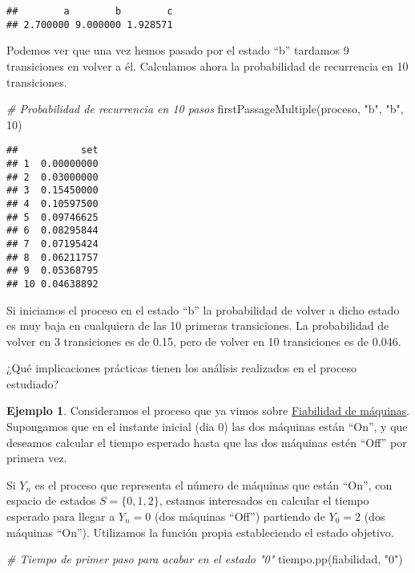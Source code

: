 \documentclass[
]{book}
\newenvironment{Shaded}{\begin{snugshade}}{\end{snugshade}}
\newcommand{\CommentTok}[1]{\textcolor[rgb]{0.56,0.35,0.01}{\textit{#1}}}
\newcommand{\DecValTok}[1]{\textcolor[rgb]{0.00,0.00,0.81}{#1}}
\newcommand{\FunctionTok}[1]{\textcolor[rgb]{0.00,0.00,0.00}{#1}}
\newcommand{\NormalTok}[1]{#1}
\newcommand{\StringTok}[1]{\textcolor[rgb]{0.31,0.60,0.02}{#1}}
\theoremstyle{definition}
\theoremstyle{definition}
\newtheorem{example}{Ejemplo}[chapter]
\theoremstyle{definition}
\theoremstyle{definition}
\theoremstyle{remark}
\begin{document}
\begin{verbatim}
##        a        b        c 
## 2.700000 9.000000 1.928571
\end{verbatim}

Podemos ver que una vez hemos pasado por el estado ``b'' tardamos 9 transiciones en volver a él. Calculamos ahora la probabilidad de recurrencia en 10 transiciones.

\begin{Shaded}
\begin{Highlighting}[]
\CommentTok{\# Probabilidad de recurrencia en 10 pasos}
\FunctionTok{firstPassageMultiple}\NormalTok{(proceso, }\StringTok{"b"}\NormalTok{, }\StringTok{"b"}\NormalTok{, }\DecValTok{10}\NormalTok{)}
\end{Highlighting}
\end{Shaded}

\begin{verbatim}
##           set
## 1  0.00000000
## 2  0.03000000
## 3  0.15450000
## 4  0.10597500
## 5  0.09746625
## 6  0.08295844
## 7  0.07195424
## 8  0.06211757
## 9  0.05368795
## 10 0.04638892
\end{verbatim}

Si iniciamos el proceso en el estado ``b'' la probabilidad de volver a dicho estado es muy baja en cualquiera de las 10 primeras transiciones. La probabilidad de volver en 3 transiciones es de 0.15, pero de volver en 10 transiciones es de 0.046.

¿Qué implicaciones prácticas tienen los análisis realizados en el proceso estudiado?

\begin{example}
Consideramos el proceso que ya vimos sobre \protect\hyperlink{fiabilidad}{Fiabilidad de máquinas}. Supongamos que en el instante inicial (dia 0) las dos máquinas están ``On'', y que deseamos calcular el tiempo esperado hasta que las dos máquinas estén ``Off'' por primera vez.
\end{example}

Si \(Y_n\) es el proceso que representa el número de máquinas que están ``On'', con espacio de estados \(S = \{0, 1, 2\}\), estamos interesados en calcular el tiempo esperado para llegar a \(Y_n = 0\) (dos máquinas ``Off'') partiendo de \(Y_0 = 2\) (dos máquinas ``On''). Utilizamos la función propia estableciendo el estado objetivo.

\begin{Shaded}
\begin{Highlighting}[]
\CommentTok{\# Tiempo de primer paso para acabar en el estado "0"}
\FunctionTok{tiempo.pp}\NormalTok{(fiabilidad, }\StringTok{"0"}\NormalTok{)}
\end{Highlighting}
\end{Shaded}
\end{document}
